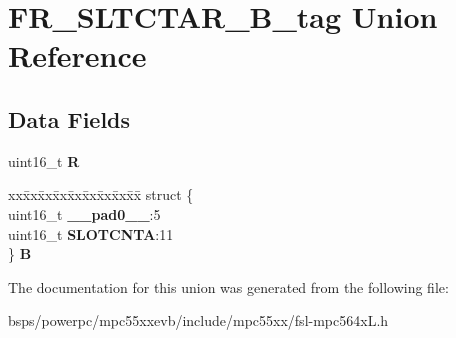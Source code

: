 \hypertarget{unionFR__SLTCTAR__16B__tag}{}\section{F\+R\+\_\+\+S\+L\+T\+C\+T\+A\+R\+\_\+B\+\_\+tag Union Reference}
\label{unionFR__SLTCTAR__16B__tag}
\subsection*{Data Fields}
\begin{DoxyCompactItemize}
\item 
\mbox{\label{unionFR__SLTCTAR__16B__tag_af74476f3311696312a66d525b99fb4fc}} 
uint16\+\_\+t {\bfseries R}
\item 
\mbox{\label{unionFR__SLTCTAR__16B__tag_a4cbc83d9da073bcb5eff3e20966c86cd}} 
\begin{tabbing}
xx\=xx\=xx\=xx\=xx\=xx\=xx\=xx\=xx\=\kill
struct \{\\
\>uint16\_t {\bfseries \_\_pad0\_\_}:5\\
\>uint16\_t {\bfseries SLOTCNTA}:11\\
\} {\bfseries B}\\

\end{tabbing}\end{DoxyCompactItemize}


The documentation for this union was generated from the following file\+:\begin{DoxyCompactItemize}
\item 
bsps/powerpc/mpc55xxevb/include/mpc55xx/fsl-\/mpc564x\+L.\+h\end{DoxyCompactItemize}
